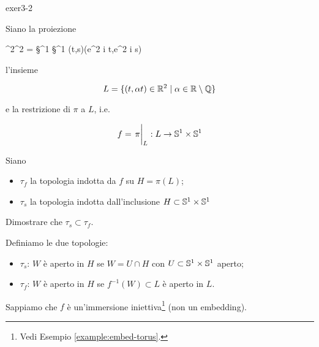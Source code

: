 {exer3-2}
{
Siano la proiezione

\map{\pi}
	{\R^{2}}{\T^{2} = \S^{1} \times \S^{1}}
	{(t,s)}{(e^{2 \pi i t},e^{2 \pi i s})}

l'insieme

\begin{equation}
	L = \{ (t,\alpha t) \in \R^{2} \mid \alpha \in \R \setminus \Q \}
\end{equation}

e la restrizione di $ \pi $ a $ L $, i.e.

\begin{equation}
	f = \eval{\pi}_{L} : L \to \S^{1} \times \S^{1}
\end{equation}

Siano

\begin{itemize}
	\item $ \tau_{f} $ la topologia indotta da $ f $ su $ H = \pi(L) $;
	
	\item $ \tau_{s} $ la topologia indotta dall'inclusione $ H \subset \S^{1} \times \S^{1} $
\end{itemize}

Dimostrare che $ \tau_{s} \subset \tau_{f} $.
}
{
Definiamo le due topologie:

\begin{itemize}
	\item $ \tau_{s} $: $ W $ è aperto in $ H $ se $ W = U \cap H $ con $ U \subset \S^{1} \times \S^{1} $ aperto;
	
	\item $ \tau_{f} $: $ W $ è aperto in $ H $ se $ f^{-1}(W) \subset L $ è aperto in $ L $.
\end{itemize}

Sappiamo che $ f $ è un'immersione iniettiva\footnote{%
	Vedi Esempio \ref{example:embed-torus}.%
} (non un embedding).
}


